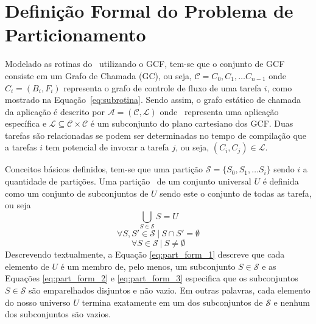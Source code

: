     \section{Definição Formal do Problema de Particionamento \HS} \label{sec:definicao_particionamento}
        
        Modelado as rotinas do \software\ utilizando o GCF, tem-se que o conjunto de GCF consiste em um Grafo de Chamada (GC), ou seja,
        $ \mathcal{C} = {C_0, C_1, \dots C_{n-1}} $
        onde $ C_i = (B_i, F_i) $ representa o grafo de controle de fluxo de uma tarefa $ i $, como mostrado na Equação~\ref{eq:subrotina}.
        Sendo assim, o grafo estático de chamada da aplicação é descrito por
        $ \mathcal{A} = (\mathcal{C}, \mathcal{L}) \label{eq:a} $
        onde \A\ representa uma aplicação específica e $ \mathcal{L} \subseteq \mathcal{C} \times \mathcal{C} $ é um subconjunto do plano cartesiano dos GCF.
        Duas tarefas são relacionadas se podem ser determinadas no tempo de compilação que a tarefas $ i $ tem potencial de invocar a tarefa $ j $, ou seja, $ (C_i, C_j) \in \mathcal{L} $.
       
        
        Conceitos básicos definidos, tem-se que uma partição $ \mathcal{S} = \{S_0, S_1, \dots S_i\} $ sendo $ i $ a quantidade de partições.
        Uma partição \Ss\ de um conjunto universal $ U $ é definida como um conjunto de subconjuntos de $ U $ sendo este o conjunto de todas as tarefa, ou seja
        \begin{equation}
            \bigcup_{S \in \mathcal{S}} S = U \label{eq:part_form_1}
        \end{equation}
        \begin{equation}
            \forall S, S' \in \mathcal{S}\ |\ S \cap S' = \emptyset \label{eq:part_form_2}
        \end{equation}
        \begin{equation}
            \forall S \in \mathcal{S}\ |\ S \neq \emptyset \label{eq:part_form_3}
        \end{equation}
        Descrevendo textualmente, a Equação \ref{eq:part_form_1} descreve que cada elemento de $ U $ é um membro de, pelo menos, um subconjunto $ S \in \mathcal{S} $ e as Equações \ref{eq:part_form_2} e \ref{eq:part_form_3} especifica que os subconjuntos $ S \in \mathcal{S} $ são emparelhados disjuntos e não vazio.
        Em outras palavras, cada elemento do nosso universo $ U $ termina exatamente em um dos subconjuntos de $\mathcal{S}$ e nenhum dos subconjuntos são vazios.
        

